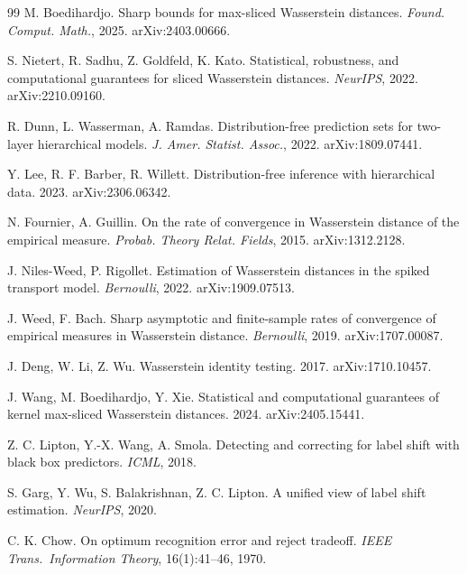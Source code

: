 \begin{thebibliography}{99}
 M. Boedihardjo. Sharp bounds for max-sliced Wasserstein
distances. \emph{Found. Comput. Math.}, 2025. arXiv:2403.00666.

 S. Nietert, R. Sadhu, Z. Goldfeld, K. Kato. Statistical,
robustness, and computational guarantees for sliced Wasserstein distances.
\emph{NeurIPS}, 2022. arXiv:2210.09160.

 R. Dunn, L. Wasserman, A. Ramdas. Distribution-free
prediction sets for two-layer hierarchical models. \emph{J. Amer. Statist. Assoc.},
2022. arXiv:1809.07441.

 Y. Lee, R. F. Barber, R. Willett. Distribution-free
inference with hierarchical data. 2023. arXiv:2306.06342.

 N. Fournier, A. Guillin. On the rate of convergence in
Wasserstein distance of the empirical measure. \emph{Probab. Theory Relat. Fields},
2015. arXiv:1312.2128.

 J. Niles-Weed, P. Rigollet. Estimation of Wasserstein
distances in the spiked transport model. \emph{Bernoulli}, 2022. arXiv:1909.07513.

 J. Weed, F. Bach. Sharp asymptotic and finite-sample rates of
convergence of empirical measures in Wasserstein distance. \emph{Bernoulli}, 2019.
arXiv:1707.00087.

 J. Deng, W. Li, Z. Wu. Wasserstein identity testing.
2017. arXiv:1710.10457.

 J. Wang, M. Boedihardjo, Y. Xie. Statistical and computational
guarantees of kernel max-sliced Wasserstein distances. 2024. arXiv:2405.15441.
\fi

 Z. C. Lipton, Y.-X. Wang, A. Smola. Detecting and correcting
for label shift with black box predictors. \emph{ICML}, 2018.

 S. Garg, Y. Wu, S. Balakrishnan, Z. C. Lipton. A unified
view of label shift estimation. \emph{NeurIPS}, 2020.

 C. K. Chow. On optimum recognition error and reject tradeoff.
\emph{IEEE Trans.\ Information Theory}, 16(1):41--46, 1970.


\end{thebibliography}

